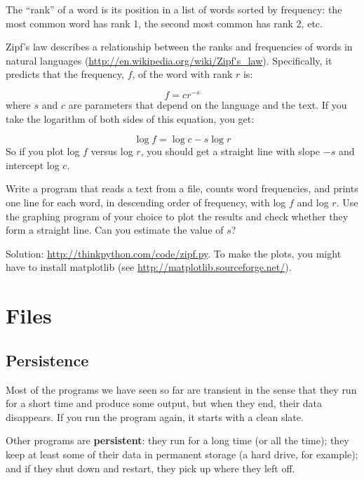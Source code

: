 \documentclass[10pt]{book}
\begin{document}
\begin{exercise}

The ``rank'' of a word is its position in a list of words
sorted by frequency: the most common word has rank 1, the
second most common has rank 2, etc.

Zipf's law describes a relationship between the ranks and frequencies
of words in natural languages
(\url{http://en.wikipedia.org/wiki/Zipf's_law}).  Specifically, it
predicts that the frequency, $f$, of the word with rank $r$ is:

\[ f = c r^{-s} \]
%
where $s$ and $c$ are parameters that depend on the language and the
text.  If you take the logarithm of both sides of this equation, you
get:

\[ \log f = \log c - s \log r \]
%
So if you plot log $f$ versus log $r$, you should get
a straight line with slope $-s$ and intercept log $c$.

Write a program that reads a text from a file, counts
word frequencies, and prints one line
for each word, in descending order of frequency, with
log $f$ and log $r$.  Use the graphing program of your
choice to plot the results and check whether they form
a straight line.  Can you estimate the value of $s$?

Solution: \url{http://thinkpython.com/code/zipf.py}.  To make the plots, you
might have to install matplotlib (see
\url{http://matplotlib.sourceforge.net/}).

\end{exercise}


\chapter{Files}


\section{Persistence}

Most of the programs we have seen so far are transient in the
sense that they run for a short time and produce some output,
but when they end, their data disappears.  If you run the program
again, it starts with a clean slate.

Other programs are {\bf persistent}: they run for a long time
(or all the time); they keep at least some of their data
in permanent storage (a hard drive, for example); and
if they shut down and restart, they pick up where they left off.
\end{document}
